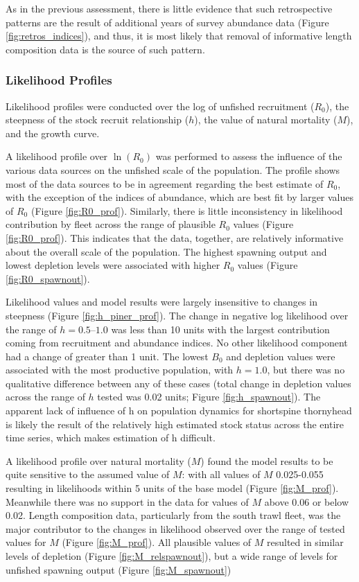 \documentclass[11pt,
  english,
  letterpaper,
]{article}
\begin{document}
As in the previous assessment, there is little evidence that such retrospective patterns are the result of additional years of survey abundance data (Figure \ref{fig:retros_indices}), and thus, it is most likely that removal of informative length composition data is the source of such pattern.

\hypertarget{likelihood-profiles}{%
\subsubsection{Likelihood Profiles}\label{likelihood-profiles}}

Likelihood profiles were conducted over the log of unfished recruitment (\(R_0\)), the steepness of the stock recruit relationship (\(h\)), the value of natural mortality (\(M\)), and the growth curve.

A likelihood profile over \(\ln(R_0)\) was performed to assess the influence of the various data sources on the unfished scale of the population. The profile shows most of the data sources to be in agreement regarding the best estimate of \(R_0\), with the exception of the indices of abundance, which are best fit by larger values of \(R_0\) (Figure \ref{fig:R0_prof}). Similarly, there is little inconsistency in likelihood contribution by fleet across the range of plausible \(R_0\) values (Figure \ref{fig:R0_prof}). This indicates that the data, together, are relatively informative about the overall scale of the population. The highest spawning output and lowest depletion levels were associated with higher \(R_0\) values (Figure \ref{fig:R0_spawnout}).

Likelihood values and model results were largely insensitive to changes in steepness (Figure \ref{fig:h_piner_prof}). The change in negative log likelihood over the range of \(h = 0.5–1.0\) was less than 10 units with the largest contribution coming from recruitment and abundance indices. No other likelihood component had a change of greater than 1 unit. The lowest \(B_0\) and depletion values were associated with the most productive population, with \(h = 1.0\), but there was no qualitative difference between any of these cases (total change in depletion values across the range of \(h\) tested was 0.02 units; Figure \ref{fig:h_spawnout}). The apparent lack of influence of h on population dynamics for shortspine thornyhead is likely the result of the relatively high estimated stock status across the entire time series, which makes estimation of h difficult.

A likelihood profile over natural mortality (\(M\)) found the model results to be quite sensitive to the assumed value of \(M\): with all values of \(M\) 0.025-0.055 resulting in likelihoods within 5 units of the base model (Figure \ref{fig:M_prof}). Meanwhile there was no support in the data for values of \(M\) above 0.06 or below 0.02. Length composition data, particularly from the south trawl fleet, was the major contributor to the changes in likelihood observed over the range of tested values for \(M\) (Figure \ref{fig:M_prof}). All plausible values of \(M\) resulted in similar levels of depletion (Figure \ref{fig:M_relspawnout}), but a wide range of levels for unfished spawning output (Figure \ref{fig:M_spawnout})
\end{document}
